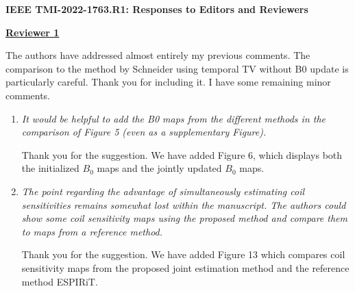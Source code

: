 \documentclass[a4paper,11pt]{report}
\begin{document}
	
\begin{center}
	{\large\textbf{IEEE TMI-2022-1763.R1: Responses to Editors and Reviewers}}
\end{center}




\noindent \underline{\textbf{Reviewer 1}}

\noindent The authors have addressed almost entirely my previous comments. The comparison to the method by Schneider using temporal TV without B0 update is particularly careful. Thank you for including it. I have some remaining minor comments.

\begin{enumerate}
	\item \textit{It would be helpful to add the B0 maps from the different methods in the comparison of Figure 5 (even as a supplementary Figure).}

\hspace{1em} Thank you for the suggestion. 
We have added Figure 6, 
which displays both the initialized $B_0$ maps and the jointly updated $B_0$ maps.

	\item \textit{The point regarding the advantage of simultaneously estimating coil sensitivities remains somewhat lost within the manuscript. The authors could show some coil sensitivity maps using the proposed method and compare them to  maps from a reference method.}

\hspace{1em} Thank you for the suggestion. 
We have added Figure 13 which compares coil sensitivity maps from 
the proposed joint estimation method and the reference method ESPIRiT.

\end{enumerate}
\end{document}
